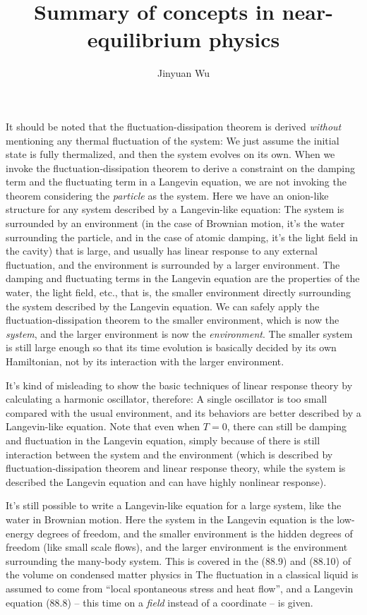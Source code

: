 \documentclass[hyperref, a4paper]{article}
\title{Summary of concepts in near-equilibrium physics}
\author{Jinyuan Wu}
\begin{document}
\maketitle

It should be noted that the fluctuation-dissipation theorem 
is derived \emph{without} mentioning any thermal fluctuation of the system:
We just assume the initial state is fully thermalized,
and then the system evolves on its own.
When we invoke the fluctuation-dissipation theorem to derive a constraint on 
the damping term and the fluctuating term in a Langevin equation,
we are not invoking the theorem considering the \emph{particle} as the system.
Here we have an onion-like structure 
for any system described by a Langevin-like equation:
The system is surrounded by an environment
(in the case of Brownian motion, it's the water surrounding the particle,
and in the case of atomic damping, 
it's the light field in the cavity) that is large, 
and usually has linear response to any external fluctuation,
and the environment is surrounded by a larger environment.
The damping and fluctuating terms in the Langevin equation 
are the properties of the water, the light field, etc.,
that is, the smaller environment directly surrounding the system described by the Langevin equation.
We can safely apply the fluctuation-dissipation theorem to the smaller environment,
which is now the \emph{system}, 
and the larger environment is now the \emph{environment}.
The smaller system is still large enough 
so that its time evolution is basically decided by its own Hamiltonian,
not by its interaction with the larger environment.

It's kind of misleading to show the basic techniques of linear response theory 
by calculating a harmonic oscillator, therefore:
A single oscillator is too small compared with the usual environment,
and its behaviors are better described by a Langevin-like equation.
Note that even when $T = 0$,
there can still be damping and fluctuation in the Langevin equation,
simply because of there is still interaction between the system and the environment
(which is described by fluctuation-dissipation theorem and linear response theory,
while the system is described the Langevin equation and can have highly nonlinear response).

It's still possible to write a Langevin-like equation for a large system,
like the water in Brownian motion.
Here the system in the Langevin equation is the low-energy degrees of freedom,
and the smaller environment is the hidden degrees of freedom 
(like small scale flows),
and the larger environment is the environment surrounding the many-body system.
This is covered in the (88.9) and (88.10) of the volume on condensed matter physics in 
The fluctuation in a classical liquid is assumed to come from 
``local spontaneous stress and heat flow'',
and a Langevin equation (88.8) -- this time on a \emph{field} instead of a coordinate --
is given.
\end{document}
